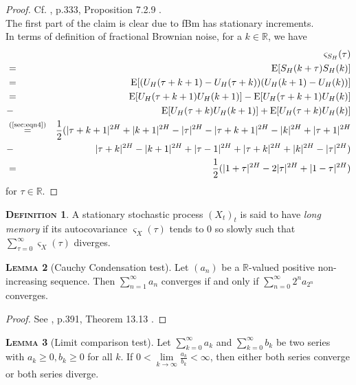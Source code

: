 \documentclass[a4paper, twoside, 11pt]{article}
\theoremstyle{definition}
\newtheorem{definition}{\scshape Definition}[section]
\newtheorem{lemma}[definition]{\scshape Lemma}
\begin{document}
	\begin{proof}
	  Cf. \cite{nourdin}, p.333, Proposition 7.2.9 .\\
	  The first part of the claim is clear due to fBm has stationary increments.\\
	  In terms of definition of fractional Brownian noise, for a $k \in \mathbb{R}$, we have
	  \begin{eqnarray*}
		&&\varsigma_{S_H}(\tau)\\
		&=& \mathrm{E}[S_H(k+\tau)S_H(k)] \\
		&=& \mathrm{E}[(U_H(\tau+k+1) - U_H(\tau+k))(U_H(k+1)-U_H(k))]\\
		&=& \mathrm{E}[U_H(\tau+k+1)U_H(k+1)] - \mathrm{E}[U_H(\tau+k+1)U_H(k)] \\
		&-& \mathrm{E}[U_H(\tau+k)U_H(k+1)] + \mathrm{E}[U_H(\tau+k)U_H(k)]\\
		&\overset{\text{(\ref{sec:eqn4})}}{=}& \frac{1}{2} ( |\tau+k+1|^{2H} + |k+1|^{2H} - |\tau|^{2H} - |\tau+k+1|^{2H} - |k|^{2H} + |\tau+1|^{2H}\\
		&-& |\tau+k|^{2H} - |k+1|^{2H} + |\tau-1|^{2H} + |\tau+k|^{2H} + |k|^{2H} - |\tau|^{2H})\\
		&=& \frac{1}{2}(|1+\tau|^{2H} - 2|\tau|^{2H} + |1-\tau|^{2H})
	  \end{eqnarray*}
	  for $\tau \in \mathbb{R}$.
	\end{proof}

	\begin{definition}
	  A stationary stochastic process $(X_t)_t$ is said to have \emph{long memory} if its autocovariance $\varsigma_X(\tau)$ tends to $0$ so slowly such that
	  $ \sum_{\tau = 0} ^{\infty} \varsigma_X(\tau)$ diverges.
	\end{definition}

	\begin{lemma}[Cauchy Condensation test]
	  Let $(a_n)$ be a $\mathbb{R}$-valued positive non-increasing sequence. Then $\sum_{n=1}^{\infty} a_n$ converges if and only if $\sum_{n=0}^{\infty} 2^n a_{2^n}$ converges.
	  \label{sec:cauchy}
	\end{lemma}
	\begin{proof}
	  See \cite{michael}, p.391, Theorem 13.13 .
	\end{proof}

	\begin{lemma}[Limit comparison test]
	  Let $\sum_{k=0}^{\infty} a_k$ and $\sum_{k=0}^{\infty} b_k$ be two series with $a_k \ge 0, b_k \ge 0$ for all $k$. If $0 <\lim\limits_{k\rightarrow \infty}\frac{a_k}{b_k} < \infty$, then either both series converge or both series diverge.
	\end{lemma}
\end{document}
